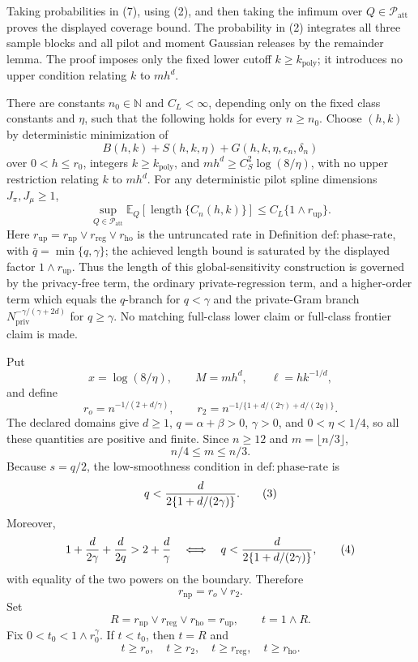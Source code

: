 Taking probabilities in (7), using (2), and then taking the infimum over \(Q\in\mathcal P_{\mathrm{att}}\) proves the displayed coverage bound.  The probability in (2) integrates all three sample blocks and all pilot and moment Gaussian releases by the remainder lemma.  The proof imposes only the fixed lower cutoff \(k\ge k_{\mathrm{poly}}\); it introduces no upper condition relating \(k\) to \(mh^d\).

There are constants \(n_0\in\mathbb N\) and \(C_L<\infty\), depending only on the fixed class constants and \(\eta\), such that the following holds for every \(n\ge n_0\). Choose \((h,k)\) by deterministic minimization of
\[
 B(h,k)+S(h,k,\eta)+G(h,k,\eta,\epsilon_n,\delta_n)
\]
over \(0<h\le r_0\), integers \(k\ge k_{\mathrm{poly}}\), and \(m h^d\ge C_S^2\log(8/\eta)\), with no upper restriction relating \(k\) to \(m h^d\). For any deterministic pilot spline dimensions \(J_\pi,J_\mu\ge1\),
\[
 \sup_{Q\in\mathcal P_{\mathrm{att}}}
 \mathbb E_Q[\operatorname{length}\{C_n(h,k)\}]
 \le C_L\{1\wedge r_{\mathrm{up}}\}.
\]
Here \(r_{\mathrm{up}}=r_{\mathrm{np}}\vee r_{\mathrm{reg}}\vee r_{\mathrm{ho}}\) is the untruncated rate in Definition \(\mathrm{def{:}phase\text{-}rate}\), with \(\bar q=\min\{q,\gamma\}\); the achieved length bound is saturated by the displayed factor \(1\wedge r_{\mathrm{up}}\). Thus the length of this global-sensitivity construction is governed by the privacy-free term, the ordinary private-regression term, and a higher-order term which equals the \(q\)-branch for \(q<\gamma\) and the private-Gram branch \(N_{\mathrm{priv}}^{-\gamma/(\gamma+2d)}\) for \(q\ge\gamma\). No matching full-class lower claim or full-class frontier claim is made.

Put
\[
 x=\log(8/\eta),\qquad M=mh^d,\qquad \ell=hk^{-1/d},
\]
and define
\[
 r_o=n^{-1/(2+d/\gamma)},
 \qquad
 r_2=n^{-1/\{1+d/(2\gamma)+d/(2q)\}}.
\tag{1}
\]
The declared domains give \(d\ge1\), \(q=\alpha+\beta>0\), \(\gamma>0\), and \(0<\eta<1/4\), so all these quantities are positive and finite.  Since \(n\ge12\) and \(m=\lfloor n/3\rfloor\),
\[
 n/4\le m\le n/3.
\tag{2}
\]
Because \(s=q/2\), the low-smoothness condition in \(\mathrm{def{:}phase\text{-}rate}\) is
\[
 q<{d\over2\{1+d/(2\gamma)\}}.
\tag{3}
\]
Moreover,
\[
 1+{d\over2\gamma}+{d\over2q}>2+{d\over\gamma}
 \quad\Longleftrightarrow\quad
 q<{d\over2\{1+d/(2\gamma)\}},
\tag{4}
\]
with equality of the two powers on the boundary.  Therefore
\[
 r_{\mathrm{np}}=r_o\vee r_2.
\tag{5}
\]
Set
\[
 R=r_{\mathrm{np}}\vee r_{\mathrm{reg}}\vee r_{\mathrm{ho}}=r_{\mathrm{up}},
 \qquad t=1\wedge R.
\tag{6}
\]
Fix \(0<t_0<1\wedge r_0^\gamma\).  If \(t<t_0\), then \(t=R\) and
\[
 t\ge r_o,\quad t\ge r_2,
 \quad t\ge r_{\mathrm{reg}},\quad t\ge r_{\mathrm{ho}}.
\tag{7}
\]

